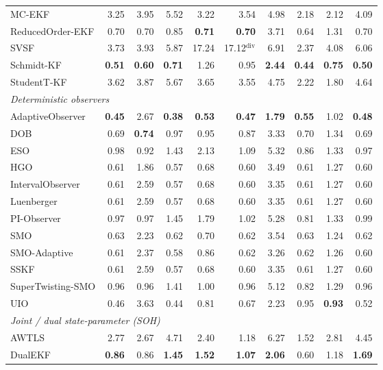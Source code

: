 \begin{longtable}{lrrrrrrrrr}
\quad MC-EKF & 3.25 & 3.95 & 5.52 & 3.22 & 3.54 & 4.98 & 2.18 & 2.12 & 4.09 \\
\quad ReducedOrder-EKF & 0.70 & 0.70 & 0.85 & \textbf{0.71} & \textbf{0.70} & 3.71 & 0.64 & 1.31 & 0.70 \\
\quad SVSF & 3.73 & 3.93 & 5.87 & 17.24 & 17.12$^{\mathrm{div}}$ & 6.91 & 2.37 & 4.08 & 6.06 \\
\quad Schmidt-KF & \textbf{0.51} & \textbf{0.60} & \textbf{0.71} & 1.26 & 0.95 & \textbf{2.44} & \textbf{0.44} & \textbf{0.75} & \textbf{0.50} \\
\quad StudentT-KF & 3.62 & 3.87 & 5.67 & 3.65 & 3.55 & 4.75 & 2.22 & 1.80 & 4.64 \\
\multicolumn{10}{l}{\textit{Deterministic observers}} \\
\quad AdaptiveObserver & \textbf{0.45} & 2.67 & \textbf{0.38} & \textbf{0.53} & \textbf{0.47} & \textbf{1.79} & \textbf{0.55} & 1.02 & \textbf{0.48} \\
\quad DOB & 0.69 & \textbf{0.74} & 0.97 & 0.95 & 0.87 & 3.33 & 0.70 & 1.34 & 0.69 \\
\quad ESO & 0.98 & 0.92 & 1.43 & 2.13 & 1.09 & 5.32 & 0.86 & 1.33 & 0.97 \\
\quad HGO & 0.61 & 1.86 & 0.57 & 0.68 & 0.60 & 3.49 & 0.61 & 1.27 & 0.60 \\
\quad IntervalObserver & 0.61 & 2.59 & 0.57 & 0.68 & 0.60 & 3.35 & 0.61 & 1.27 & 0.60 \\
\quad Luenberger & 0.61 & 2.59 & 0.57 & 0.68 & 0.60 & 3.35 & 0.61 & 1.27 & 0.60 \\
\quad PI-Observer & 0.97 & 0.97 & 1.45 & 1.79 & 1.02 & 5.28 & 0.81 & 1.33 & 0.99 \\
\quad SMO & 0.63 & 2.23 & 0.62 & 0.70 & 0.62 & 3.54 & 0.63 & 1.24 & 0.62 \\
\quad SMO-Adaptive & 0.61 & 2.37 & 0.58 & 0.86 & 0.62 & 3.26 & 0.62 & 1.26 & 0.60 \\
\quad SSKF & 0.61 & 2.59 & 0.57 & 0.68 & 0.60 & 3.35 & 0.61 & 1.27 & 0.60 \\
\quad SuperTwisting-SMO & 0.96 & 0.96 & 1.41 & 1.00 & 0.96 & 5.12 & 0.82 & 1.29 & 0.96 \\
\quad UIO & 0.46 & 3.63 & 0.44 & 0.81 & 0.67 & 2.23 & 0.95 & \textbf{0.93} & 0.52 \\
\multicolumn{10}{l}{\textit{Joint / dual state-parameter (SOH)}} \\
\quad AWTLS & 2.77 & 2.67 & 4.71 & 2.40 & 1.18 & 6.27 & 1.52 & 2.81 & 4.45 \\
\quad DualEKF & \textbf{0.86} & 0.86 & \textbf{1.45} & \textbf{1.52} & \textbf{1.07} & \textbf{2.06} & 0.60 & 1.18 & \textbf{1.69} \\

\end{longtable}
